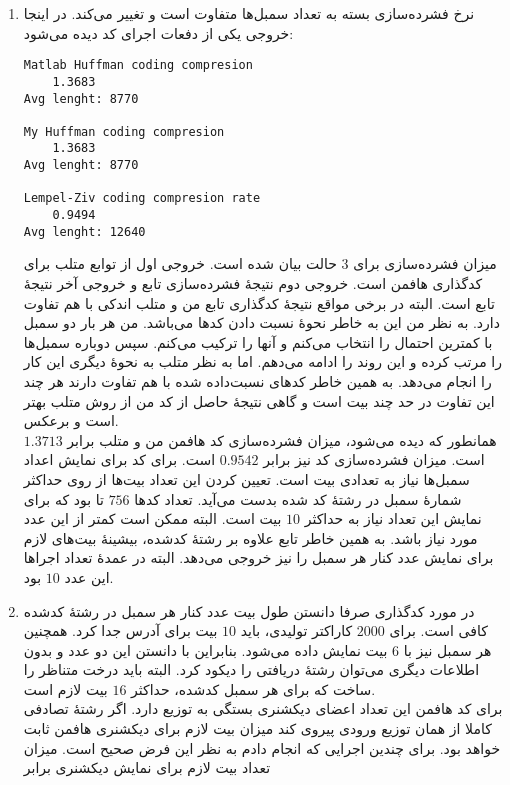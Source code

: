 \documentclass[a4paper]{article}
\begin{document}
\begin{enumerate}[1)]
\item نرخ فشرده‌سازی بسته به تعداد سمبل‌ها متفاوت است و تغییر می‌کند. در اینجا خروجی یکی از دفعات اجرای کد دیده می‌شود:
\begin{latin}
\begin{Verbatim}[frame=single,
				baselinestretch=1.2,
				xleftmargin=1.5cm,
				xrightmargin=1.5cm,
				breaklines=true]
Matlab Huffman coding compresion
    1.3683
Avg lenght: 8770

My Huffman coding compresion
    1.3683
Avg lenght: 8770

Lempel-Ziv coding compresion rate
    0.9494
Avg lenght: 12640
\end{Verbatim}
\end{latin}
میزان فشرده‌سازی برای 3 حالت بیان شده است. خروجی اول از توابع متلب برای کدگذاری هافمن است. خروجی دوم نتیجۀ فشرده‌سازی تابع 
و خروجی آخر نتیجۀ تابع
است. البته در برخی مواقع نتیجۀ کدگذاری 
تابع من و متلب اندکی با هم تفاوت دارد. به نظر من این به خاطر نحوۀ نسبت دادن کدها می‌باشد. من هر بار دو سمبل با کمترین احتمال را انتخاب می‌کنم و آنها را ترکیب می‌کنم. سپس دوباره سمبل‌ها را مرتب کرده و این روند را ادامه می‌دهم. اما به نظر متلب به نحوۀ دیگری این کار را انجام می‌دهد. به همین خاطر کد‌های نسبت‌داده شده با هم تفاوت دارند هر چند این تفاوت در حد چند بیت است و گاهی نتیجۀ حاصل از کد من از روش متلب بهتر است و برعکس. \\
همانطور که دیده می‌شود، میزان فشرده‌سازی کد هافمن من و متلب برابر 
$1.3713$
است. میزان فشرده‌سازی کد 
نیز برابر 
$0.9542$
است. برای کد 
برای نمایش اعداد سمبل‌ها نیاز به تعدادی بیت است. تعیین کردن این تعداد بیت‌ها از روی حداکثر شمارۀ سمبل در رشتۀ کد شده بدست می‌آید. تعداد کدها 
$756$
تا بود که برای نمایش این تعداد نیاز به حداکثر 
$10$
بیت است. البته ممکن است کمتر از این عدد مورد نیاز باشد. به همین خاطر تابع
علاوه بر رشتۀ کدشده، بیشینۀ بیت‌های لازم برای نمایش عدد کنار هر سمبل را نیز خروجی می‌دهد. البته در عمدۀ تعداد اجراها این عدد 
$10$
بود.
\item در مورد کدگذاری 
صرفا دانستن طول بیت عدد کنار هر سمبل در رشتۀ کدشده کافی است. برای 
$2000$
کاراکتر تولیدی، باید 
$10$
بیت برای آدرس جدا کرد. همچنین هر سمبل نیز با 6 بیت نمایش داده می‌شود. بنابراین با دانستن این دو عدد و بدون اطلاعات دیگری می‌توان رشتۀ دریافتی را دیکود کرد. البته باید درخت متناظر را ساخت که برای هر سمبل کدشده، حداکثر 
$16$
بیت لازم است. \\
برای کد هافمن این تعداد اعضای دیکشنری بستگی به توزیع دارد. اگر رشتۀ تصادفی کاملا از همان توزیع ورودی پیروی کند میزان بیت لازم برای دیکشنری هافمن ثابت خواهد بود. برای چندین اجرایی که انجام دادم به نظر این فرض صحیح است. میزان تعداد بیت لازم برای نمایش دیکشنری برابر 

\end{enumerate}
\end{document}

